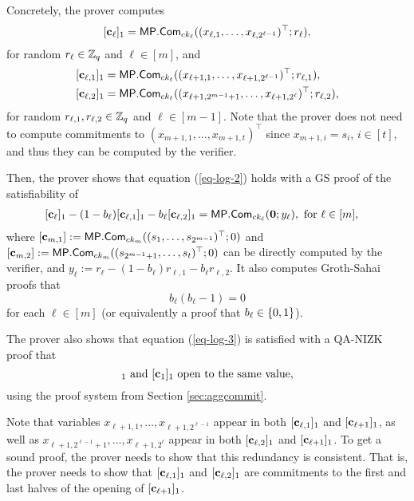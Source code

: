 Concretely, the prover computes
\begin{align*}
&[\mathbf{c}_\ell]_1=\mathsf{MP}.\mathsf{Com}_{ck_\ell}((x_{\ell,1},\ldots,x_{\ell,2^{\ell-1}})^\top;r_\ell),\\
\end{align*}
for random $r_\ell\in\mathbb{Z}_q$ and $\ell\in[m]$, and 
\begin{align*}
&[\mathbf{c}_{\ell,1}]_1=\mathsf{MP}.\mathsf{Com}_{ck_{\ell}}((x_{\ell+1,1},\ldots,x_{\ell+1,2^{\ell-1}})^\top;r_{\ell,1}),\\
&[\mathbf{c}_{\ell,2}]_1=\mathsf{MP}.\mathsf{Com}_{ck_{\ell}}((x_{\ell+1,2^{m-1}+1},\ldots,x_{\ell+1,2^\ell})^\top;r_{\ell,2}),\\
\end{align*}
for random $r_{\ell,1},r_{\ell,2}\in\mathbb{Z}_q$ and $\ell\in[m-1]$. Note that the prover does not need to compute commitments to $(x_{m+1,1},\ldots,x_{m+1,t})^\top$ since $x_{m+1,i}=s_i$, $i\in[t]$, and thus they can be computed by the verifier.

Then, the prover shows that equation (\ref{eq-log-2}) holds with a GS proof of
the satisfiability of
\begin{align}
&[\mathbf{c}_\ell]_1-(1-b_\ell)[\mathbf{c}_{\ell,1}]_1-b_\ell[\mathbf{c}_{\ell,2}]_1 = \mathsf{MP}.\mathsf{Com}_{ck_\ell}(\mathbf{0};y_\ell), \text{ for } \ell \in[m],  \label{eq-log-5}
\end{align}
where $[\mathbf{c}_{m,1}]:=\mathsf{MP}.\mathsf{Com}_{ck_m}((s_1,\ldots,s_{2^{m-1}})^\top;0)$ and $[\mathbf{c}_{m,2}]:=\allowbreak \mathsf{MP}.\mathsf{Com}_{ck_m}(\allowbreak (s_{2^{m-1}+1},\allowbreak\ldots,s_{t})^\top;0)$ can be directly computed by the verifier, and $y_\ell:=r_\ell-(1-b_\ell)r_{\ell,1}-b_\ell r_{\ell,2}$. It also computes Groth-Sahai proofs that
\begin{equation}
b_\ell(b_\ell-1)=0 \label{eq-bit-gs}
\end{equation}
for each $\ell\in[m]$ (or equivalently a proof that $b_\ell\in\{0,1\}$).

The prover also shows that equation (\ref{eq-log-3}) is satisfied with a QA-NIZK proof that
\begin{equation}
[\vecb{c}]_1\text{ and }[\vecb{c}_1]_1\text{ open to the same value}, \label{eq-log-6}
\end{equation}
using the proof system from Section \ref{sec:aggcommit}.

Note that variables $x_{\ell+1,1},\ldots,x_{\ell+1,2^{\ell-1}}$ appear in both $[\mathbf{c}_{\ell,1}]_1$ and $[\mathbf{c}_{\ell+1}]_1$, as well as $x_{\ell+1,2^{\ell-1}+1},\ldots,x_{\ell+1,2^\ell}$ appear in both $[\mathbf{c}_{\ell,2}]_1$ and $[\mathbf{c}_{\ell+1}]_1$. To get a sound proof, the prover needs to show that this redundancy is consistent. That is, the prover needs to show that $[\mathbf{c}_{\ell,1}]_1$ and $[\mathbf{c}_{\ell,2}]_1$ are commitments to the first and last halves of the opening of $[\mathbf{c}_{\ell+1}]_1$.

